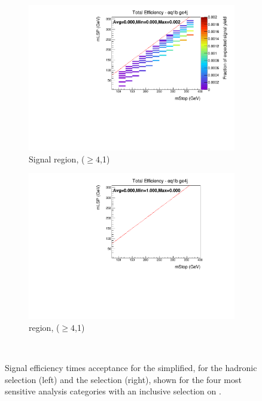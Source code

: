 \begin{figure}[ht!]
\begin{subfigure}[b]{0.47\textwidth}
    \includegraphics[width=\textwidth, trim=0 0 0 24, clip=true]{Figs/sms/t2cc/v24/T2cc_v24_had_eff_maps_eq1b_ge4j_SITV.pdf}
    \caption{Signal region, ($\geq 4$,1)}
    \label{fig:t2cc_sig_eff_ge4j_1b}
  \end{subfigure}
  \begin{subfigure}[b]{0.47\textwidth}
    \includegraphics[width=\textwidth, trim=0 0 0 24, clip=true]{Figs/sms/t2cc/v24/T2cc_v24_muon_eff_maps_eq1b_ge4j_SITV.pdf}
    \caption{\mj region, ($\geq 4$,1)}
    \label{fig:t2cc_mu_eff_ge4j_1b}
  \end{subfigure} \\
  \caption{Signal efficiency times acceptance for the \Ttwocc simplified, for 
  the hadronic selection (left) and the \mj selection (right), shown for the 
  four most sensitive analysis categories with an inclusive selection on \HT.}
  \label{fig:t2cc_eff}
\end{figure}

